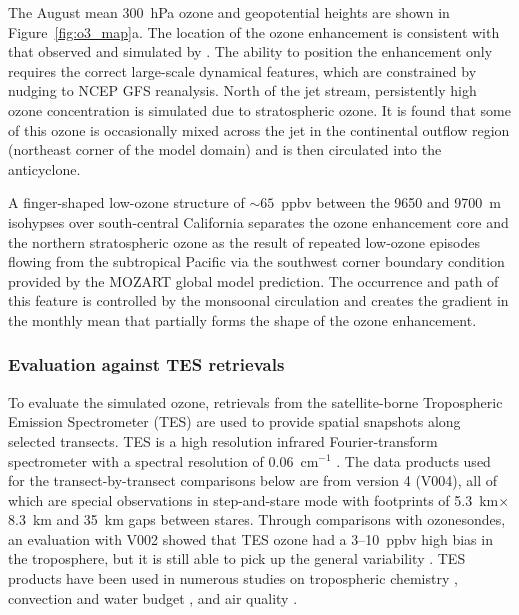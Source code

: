 The August mean 300~hPa ozone and geopotential heights are shown in Figure~\ref{fig:o3_map}a. The
location of the ozone enhancement is consistent with that observed and simulated by
\citet{Cooper:2007cr}. The ability to position the enhancement only requires the correct
large-scale dynamical features, which are constrained by nudging to NCEP GFS reanalysis.
North of the jet stream, persistently high ozone
concentration is simulated due to stratospheric ozone. It is found that some of this
ozone is occasionally mixed across the jet in the continental outflow region (northeast
corner of the model domain) and is then circulated into the anticyclone.

A finger-shaped low-ozone structure of $\sim65$~ppbv between the 9650
and 9700~m isohypses over south-central California separates the ozone enhancement
core and the northern stratospheric ozone as the result of repeated
low-ozone episodes flowing from the subtropical Pacific via the southwest corner boundary condition
provided by the MOZART global model prediction. The occurrence and path of this feature is controlled
by the monsoonal circulation and creates the gradient in the monthly mean that
partially forms the shape of the ozone enhancement.

\subsubsection{Evaluation against TES retrievals}\label{sect:val/o3/tes}

To evaluate the simulated ozone, retrievals from the satellite-borne
Tropospheric Emission Spectrometer (TES) are used to provide spatial snapshots
along selected transects. TES is a high resolution infrared Fourier-transform
spectrometer with a spectral resolution of 0.06~cm$^{-1}$ \citep{Beer:2006fk}.
The data products used for the transect-by-transect comparisons below are from version 4 (V004), all of which are special observations in
step-and-stare mode with footprints of 5.3~km$\times$8.3~km and 35~km gaps
between stares. Through comparisons with ozonesondes, an evaluation with
V002 showed that TES ozone had a 3--10~ppbv high bias in the troposphere,
but it is still able to pick up the general variability \citep{Nassar:2008mw}. TES
products have been used in numerous studies on tropospheric chemistry
\citep[e.g.][]{Hegarty:2010vn,Voulgarakis:2011fk}, convection and water budget
\citep[e.g.][]{Brown:2008zr,Risi:2010ys}, and air quality
\citep[e.g.][]{McMillan:2010kx,Wang:2011uq}.

